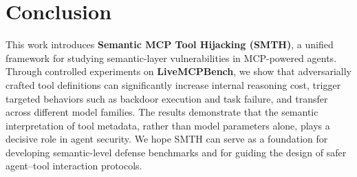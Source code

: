 \section{Conclusion}
This work introduces \textbf{Semantic MCP Tool Hijacking (SMTH)}, a unified framework for studying semantic-layer vulnerabilities in MCP-powered agents. 
Through controlled experiments on \textbf{LiveMCPBench}, we show that adversarially crafted tool definitions can significantly increase internal reasoning cost, trigger targeted behaviors such as backdoor execution and task failure, and transfer across different model families. 
The results demonstrate that the semantic interpretation of tool metadata, rather than model parameters alone, plays a decisive role in agent security. 
We hope SMTH can serve as a foundation for developing semantic-level defense benchmarks and for guiding the design of safer agent–tool interaction protocols.
